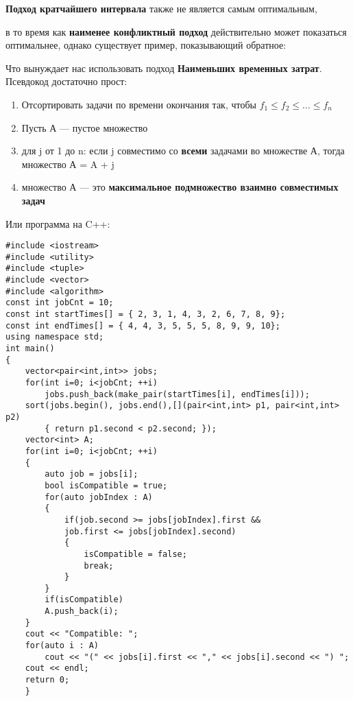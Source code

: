 \vspace{\baselineskip}

\vspace{\baselineskip}
\textbf{Подход кратчайшего интервала } также не является самым оптимальным,

\vspace{\baselineskip}

\vspace{\baselineskip}
в то время как \textbf{наименее конфликтный подход} действительно может показаться оптимальнее, однако существует пример, показывающий обратное:

\vspace{\baselineskip}

\vspace{\baselineskip}
Что вынуждает нас использовать подход \textbf{Наименьших временных затрат}. Псевдокод достаточно прост:

\vspace{\baselineskip}
\begin{enumerate} 
    \item Отсортировать задачи по времени окончания так, чтобы $f_1 \le f_2 \le ... \le f_n$
    \item Пусть А --- пустое множество
    \item для j от 1 до n: если j совместимо со \textbf{всеми} задачами во множестве А, тогда множество А = A + {j}
     \item множество А --- это \textbf{максимальное подмножество взаимно совместимых задач}
\end{enumerate}

\vspace{\baselineskip}
Или программа на C++:

\vspace{\baselineskip}
\begin{tcolorbox}
\begin{verbatim}
#include <iostream>
#include <utility>
#include <tuple>
#include <vector>
#include <algorithm>
const int jobCnt = 10;
const int startTimes[] = { 2, 3, 1, 4, 3, 2, 6, 7, 8, 9};
const int endTimes[] = { 4, 4, 3, 5, 5, 5, 8, 9, 9, 10};
using namespace std;
int main()
{
    vector<pair<int,int>> jobs;
    for(int i=0; i<jobCnt; ++i)
        jobs.push_back(make_pair(startTimes[i], endTimes[i]));
    sort(jobs.begin(), jobs.end(),[](pair<int,int> p1, pair<int,int> p2)
        { return p1.second < p2.second; });
    vector<int> A;
    for(int i=0; i<jobCnt; ++i)
    {
        auto job = jobs[i];
        bool isCompatible = true;
        for(auto jobIndex : A)
        {
            if(job.second >= jobs[jobIndex].first &&
            job.first <= jobs[jobIndex].second)
            {
                isCompatible = false;
                break;
            }
        }
        if(isCompatible)
        A.push_back(i);
    }
    cout << "Compatible: ";
    for(auto i : A)
        cout << "(" << jobs[i].first << "," << jobs[i].second << ") ";
    cout << endl;
    return 0;
    }
\end{verbatim}
\end{tcolorbox}


